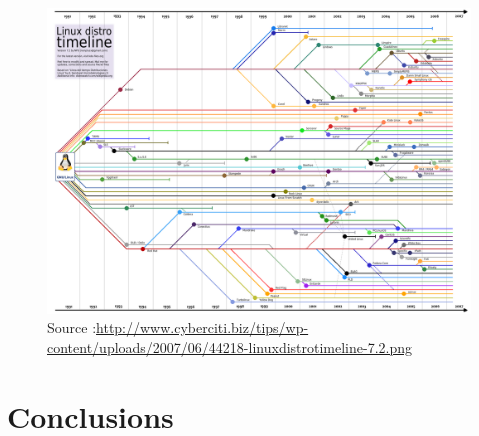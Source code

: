 \documentclass[11pt]{article} %
\begin{document}
        \begin{figure}
   \centering
\includegraphics[scale=0.2]{linuxdistrotimeline.png}
\caption{{\tiny Source :\url{http://www.cyberciti.biz/tips/wp-content/uploads/2007/06/44218-linuxdistrotimeline-7.2.png}}}
      \end{figure}




\newpage
\section{Conclusions}

\newpage 
\tableofcontents
\newpage
\end{document}
